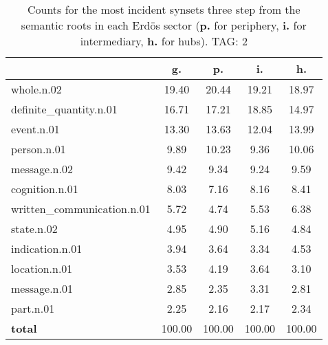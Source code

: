 \begin{table}[h!]
\begin{center}
\begin{tabular}{| l || c | c | c | c |}\hline
 & {\bf g.} & {\bf p.} & {\bf i.} & {\bf h.} \\\hline\hline
whole.n.02 & 19.40  & 20.44  & 19.21  & 18.97 \\\hline
definite\_quantity.n.01 & 16.71  & 17.21  & 18.85  & 14.97 \\\hline
event.n.01 & 13.30  & 13.63  & 12.04  & 13.99 \\\hline
person.n.01 & 9.89  & 10.23  & 9.36  & 10.06 \\\hline
message.n.02 & 9.42  & 9.34  & 9.24  & 9.59 \\\hline
cognition.n.01 & 8.03  & 7.16  & 8.16  & 8.41 \\\hline
written\_communication.n.01 & 5.72  & 4.74  & 5.53  & 6.38 \\\hline
state.n.02 & 4.95  & 4.90  & 5.16  & 4.84 \\\hline
indication.n.01 & 3.94  & 3.64  & 3.34  & 4.53 \\\hline
location.n.01 & 3.53  & 4.19  & 3.64  & 3.10 \\\hline
message.n.01 & 2.85  & 2.35  & 3.31  & 2.81 \\\hline
part.n.01 & 2.25  & 2.16  & 2.17  & 2.34 \\\hline\hline
{{\bf total}} & 100.00  & 100.00  & 100.00  & 100.00 \\\hline
\end{tabular}
\caption{Counts for the most incident synsets three step from the semantic roots in each Erd\"os sector ({\bf p.} for periphery, {\bf i.} for intermediary, {\bf h.} for hubs). TAG: 2}
\end{center}
\end{table}